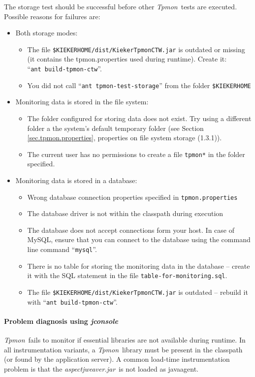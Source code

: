 \documentclass[a4paper,12pt]{scrartcl}
\newcommand{\tpmon}{\textit{Tpmon}}
\newcommand{\aspectjweaverjar}{\textit{aspectjweaver.jar}}
\begin{document}
The storage test should be successful before other \tpmon\ tests are executed. Possible reasons for failures are:
\begin{itemize}
\item Both storage modes:
\begin{itemize}
 \item The file \texttt{\$KIEKERHOME/dist/KiekerTpmonCTW.jar} is outdated or missing (it contains the tpmon.properties used during runtime). Create it: \\ ``\texttt{ant build-tpmon-ctw}''.
\item You did not call ``\texttt{ant tpmon-test-storage}'' from the folder \texttt{\$KIEKERHOME}
\end{itemize}
\item Monitoring data is stored in the file system:
\begin{itemize}
 \item The folder configured for storing data does not exist. Try using a different folder a the system's default temporary folder (see Section \ref{sec.tpmon.properties}, properties on file system storage (1.3.1)).
\item The current user has no permissions to create a file \texttt{tpmon*} in the folder specified.
\end{itemize}
\item Monitoring data is stored in a database:
\begin{itemize}
\item Wrong database connection properties specified in \texttt{tpmon.properties}
\item The database driver is not within the classpath during execution
\item The database does not accept connections form your host. In case of MySQL, ensure that
you can connect to the database using the command line command ``\texttt{mysql}''.
\item There is no table for storing the monitoring data in the database -- create it with the SQL statement in the file
\texttt{table-for-monitoring.sql}.
\item The file \texttt{\$KIEKERHOME/dist/KiekerTpmonCTW.jar} is outdated -- rebuild it with ``\texttt{ant build-tpmon-ctw}''.
\end{itemize}
\end{itemize}

\paragraph{Problem diagnosis using \textit{jconsole}}
\tpmon\ fails to monitor if essential libraries are not available during runtime. In all instrumentation variants, a \tpmon\ library must be present in the classpath (or found by the application server). A common load-time instrumentation problem is that the \aspectjweaverjar\ is not loaded as javaagent. 
\end{document}
